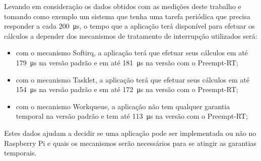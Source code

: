 Levando em consideração os dados obtidos com as medições deste trabalho e tomando como exemplo um sistema que tenha uma tarefa periódica que precisa responder a cada \SI{200}{\micro\second}, o tempo que a aplicação terá disponível para efetuar os cálculos a depender dos mecanismos de tratamento de interrupção utilizados será:

\begin{itemize}
    \item com o mecanismo Softirq, a aplicação terá que efetuar seus cálculos em até \SI{179}{\micro\second} na versão padrão e em até \SI{181}{\micro\second} na versão com o Preempt-RT;
    \item com o mecanismo Tasklet, a aplicação terá que efetuar seus cálculos em até \SI{154}{\micro\second} na versão padrão e em até \SI{172}{\micro\second} na versão com o Preempt-RT;
    \item com o mecanismo Workqueue, a aplicação não tem qualquer garantia temporal na versão padrão e tem até \SI{113}{\micro\second} na versão com o Preempt-RT;
\end{itemize}

Estes dados ajudam a decidir se uma aplicação pode ser implementada ou não no Raspberry Pi e quais os mecanismos serão necessários para se atingir as garantias temporais.